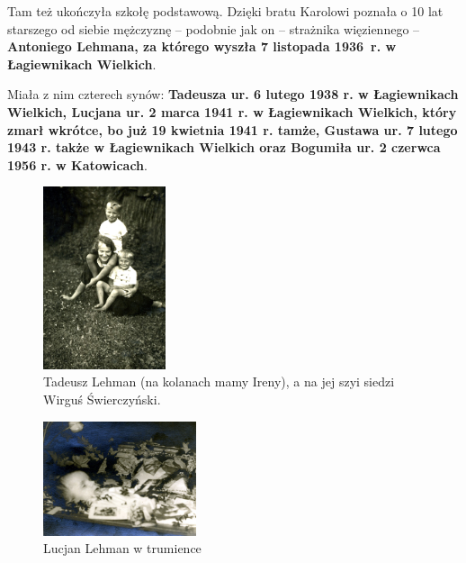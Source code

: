 Tam też ukończyła szkołę podstawową. Dzięki bratu Karolowi poznała o 10 lat starszego od siebie mężczyznę -- podobnie jak on -- strażnika więziennego -- \textbf{Antoniego Lehmana, za którego wyszła 7 listopada 1936~r. w Łagiewnikach Wielkich}.

Miała z nim czterech synów: \textbf{Tadeusza ur. 6 lutego 1938 r. w Łagiewnikach Wielkich, Lucjana ur. 2 marca 1941 r. w Łagiewnikach Wielkich, który zmarł wkrótce, bo już 19 kwietnia 1941 r. tamże, Gustawa ur. 7 lutego 1943 r. także w Łagiewnikach Wielkich oraz Bogumiła ur. 2 czerwca 1956 r. w Katowicach}.

\begin{figure}[!h]
\begin{center}
\includegraphics[width=0.32\textwidth]{photo/tadeuasz_lehman_1.jpg}
\caption[Tadeusz Lehman]{Tadeusz Lehman (na kolanach mamy Ireny), a na jej szyi siedzi Wirguś Świerczyński.}
\label{rys:tadeuasz_lehman_1}
\end{center}
\end{figure}

\begin{figure}[!h]
\begin{center}
\includegraphics[width=0.4\textwidth]{photo/lucjan_lehman_w_trumience.jpg}
\caption{Lucjan Lehman w trumience}
\label{rys:lucjan_lehman_w_trumience}
\end{center}
\end{figure}


